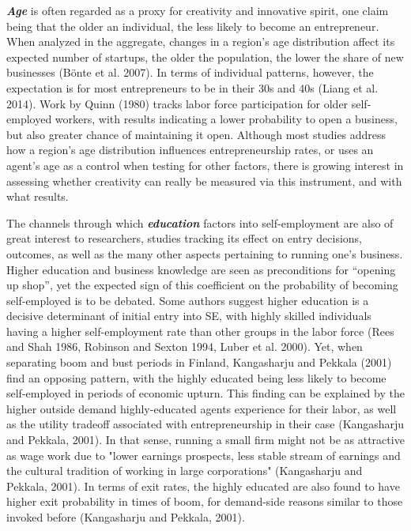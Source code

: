 \textbf{\textit{Age}} is often regarded as a proxy for creativity and innovative spirit, one claim being that the older an individual, the less likely to become an entrepreneur. When analyzed in the aggregate, changes in a region’s age distribution affect its expected number of startups, the older the population, the lower the share of new businesses (Bönte et al. 2007). In terms of individual patterns, however, the expectation is for most entrepreneurs to be in their 30s and 40s (Liang et al. 2014). Work by Quinn (1980) tracks labor force participation for older self-employed workers, with results indicating a lower probability to open a business, but also greater chance of maintaining it open. Although most studies address how a region’s age distribution influences entrepreneurship rates, or uses an agent’s age as a control when testing for other factors, there is growing interest in assessing whether creativity can really be measured via this instrument, and with what results.

The channels through which \textbf{\textit{education}} factors into self-employment are also of great interest to researchers, studies tracking its effect on entry decisions, outcomes, as well as the many other aspects pertaining to running one’s business. Higher education and business knowledge are seen as preconditions for “opening up shop”, yet the expected sign of this coefficient on the probability of becoming self-employed is to be debated. Some authors suggest higher education is a decisive determinant of initial entry into SE, with highly skilled individuals having a higher self-employment rate than other groups in the labor force (Rees and Shah 1986, Robinson and Sexton 1994, Luber et al. 2000). Yet, when separating boom and bust periods in Finland, Kangasharju and Pekkala (2001) find an opposing pattern, with the highly educated being less likely to become self-employed in periods of economic upturn. This finding can be explained by the higher outside demand highly-educated agents experience for their labor, as well as the utility tradeoff associated with entrepreneurship in their case (Kangasharju and Pekkala, 2001). In that sense, running a small firm might not be as attractive as wage work due to "lower earnings prospects, less stable stream of earnings and the cultural tradition of working in large corporations" (Kangasharju and Pekkala, 2001). In terms of exit rates, the highly educated are also found to have higher exit probability in times of boom, for demand-side reasons similar to those invoked before (Kangasharju and Pekkala, 2001).

